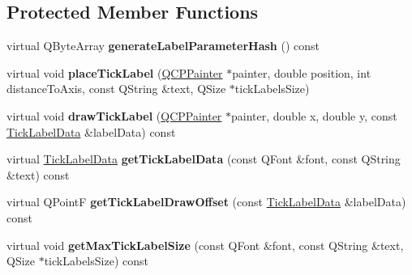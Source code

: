 \subsection*{Protected Member Functions}
\begin{DoxyCompactItemize}
\item 
virtual Q\+Byte\+Array {\bfseries generate\+Label\+Parameter\+Hash} () const \hypertarget{classQCPAxisPainterPrivate_a91a023bbefe1c3bf330570c0b985de84}{}\label{classQCPAxisPainterPrivate_a91a023bbefe1c3bf330570c0b985de84}

\item 
virtual void {\bfseries place\+Tick\+Label} (\hyperlink{classQCPPainter}{Q\+C\+P\+Painter} $\ast$painter, double position, int distance\+To\+Axis, const Q\+String \&text, Q\+Size $\ast$tick\+Labels\+Size)\hypertarget{classQCPAxisPainterPrivate_af8fe7350c19575bc33ca770f9b3a15fd}{}\label{classQCPAxisPainterPrivate_af8fe7350c19575bc33ca770f9b3a15fd}

\item 
virtual void {\bfseries draw\+Tick\+Label} (\hyperlink{classQCPPainter}{Q\+C\+P\+Painter} $\ast$painter, double x, double y, const \hyperlink{structQCPAxisPainterPrivate_1_1TickLabelData}{Tick\+Label\+Data} \&label\+Data) const \hypertarget{classQCPAxisPainterPrivate_ad8f2f12cd35b8189e8bf96679e873933}{}\label{classQCPAxisPainterPrivate_ad8f2f12cd35b8189e8bf96679e873933}

\item 
virtual \hyperlink{structQCPAxisPainterPrivate_1_1TickLabelData}{Tick\+Label\+Data} {\bfseries get\+Tick\+Label\+Data} (const Q\+Font \&font, const Q\+String \&text) const \hypertarget{classQCPAxisPainterPrivate_ad9f24fbcbf9d8c92b34d9d00b010e6a3}{}\label{classQCPAxisPainterPrivate_ad9f24fbcbf9d8c92b34d9d00b010e6a3}

\item 
virtual Q\+PointF {\bfseries get\+Tick\+Label\+Draw\+Offset} (const \hyperlink{structQCPAxisPainterPrivate_1_1TickLabelData}{Tick\+Label\+Data} \&label\+Data) const \hypertarget{classQCPAxisPainterPrivate_a6b02e6fd70cc65f726ca8cb3e6f16de4}{}\label{classQCPAxisPainterPrivate_a6b02e6fd70cc65f726ca8cb3e6f16de4}

\item 
virtual void {\bfseries get\+Max\+Tick\+Label\+Size} (const Q\+Font \&font, const Q\+String \&text, Q\+Size $\ast$tick\+Labels\+Size) const \hypertarget{classQCPAxisPainterPrivate_a8a7c82303e272485621fde78a5b674f9}{}\label{classQCPAxisPainterPrivate_a8a7c82303e272485621fde78a5b674f9}

\end{DoxyCompactItemize}
